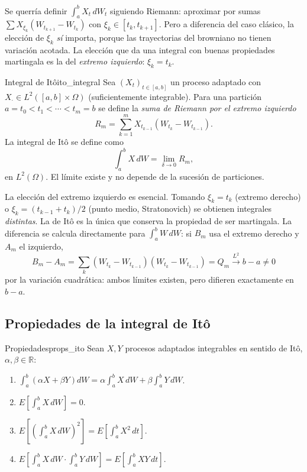 \documentclass[11pt, a4paper]{article}
\begin{document}
Se querría definir $\int_a^b X_t \, dW_t$ siguiendo Riemann: aproximar por sumas
$\sum X_{\xi_k} (W_{t_{k+1}} - W_{t_k})$ con $\xi_k \in [t_k, t_{k+1}]$. Pero a diferencia del
caso clásico, la elección de $\xi_k$ \emph{sí} importa, porque las trayectorias del browniano
no tienen variación acotada. La elección que da una integral con buenas propiedades martingala
es la del \emph{extremo izquierdo}: $\xi_k = t_k$.

\begin{definicion}{Integral de Itô}{ito_integral}
Sea $(X_t)_{t \in [a, b]}$ un proceso adaptado con $X_\cdot \in L^2([a, b] \times \Omega)$
(suficientemente integrable).
Para una partición $a = t_0 < t_1 < \cdots < t_m = b$ se define la \emph{suma de Riemann por el
extremo izquierdo}
$$ R_m = \sum_{k=1}^m X_{t_{k-1}} (W_{t_k} - W_{t_{k-1}}). $$
La integral de Itô se define como
$$ \int_a^b X \, dW = \lim_{\delta \to 0} R_m, $$
en $L^2(\Omega)$. El límite existe y no depende de la sucesión de particiones.
\end{definicion}

\obs La elección del extremo izquierdo es esencial. Tomando $\xi_k = t_k$ (extremo derecho) o
$\xi_k = (t_{k-1} + t_k)/2$ (punto medio, Stratonovich) se obtienen integrales \emph{distintas}.
La de Itô es la única que conserva la propiedad de ser martingala. La diferencia se
calcula directamente para $\int_a^b W \, dW$: si $B_m$ usa el extremo derecho y $A_m$ el
izquierdo,
$$ B_m - A_m = \sum_k \left( W_{t_k} - W_{t_{k-1}} \right) \left( W_{t_k} - W_{t_{k-1}} \right)
= Q_m \xrightarrow{L^2} b - a \ne 0 $$
por la variación cuadrática: ambos límites existen, pero difieren exactamente en $b - a$.

\subsection{Propiedades de la integral de Itô}

\begin{proposicion}{Propiedades}{props_ito}
Sean $X, Y$ procesos adaptados integrables en sentido de Itô, $\alpha, \beta \in \mathbb{R}$:
\begin{enumerate}
    \item $\int_a^b (\alpha X + \beta Y) dW = \alpha \int_a^b X \, dW + \beta \int_a^b Y \, dW$.
    \item $\displaystyle E\!\left[\int_a^b X \, dW\right] = 0$.
    \item $\displaystyle E\!\left[\left(\int_a^b X \, dW\right)^2 \right] = E\!\left[\int_a^b X^2
    \, dt\right]$.
    \item $\displaystyle E\!\left[\int_a^b X \, dW \cdot \int_a^b Y \, dW\right] =
    E\!\left[\int_a^b XY \, dt\right]$.
\end{enumerate}
\end{proposicion}
\end{document}
